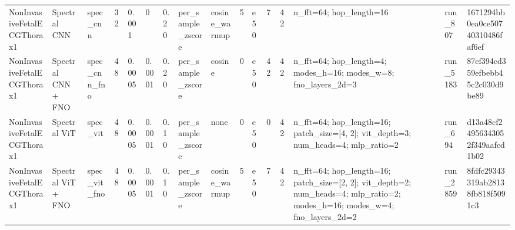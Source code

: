 \begin{table}
\begin{tabular}{llllllllllllllll}
NonInvasiveFetalECGThorax1 & Spectral CNN & spec\_cnn & 32 & 0.001 & 0 & 0.20 & per\_sample\_zscore & cosine\_warmup & 5 & e50 & 7 & 42 & n\_fft=64; hop\_length=16 & run\_807 & 1671294bb0ea0ce50740310486faf6ef \\
NonInvasiveFetalECGThorax1 & Spectral CNN + FNO & spec\_cnn\_fno & 48 & 0.0005 & 0.0001 & 0.20 & per\_sample\_zscore & cosine & 0 & e50 & 42 & 42 & n\_fft=64; hop\_length=4; modes\_h=16; modes\_w=8; fno\_layers\_2d=3 & run\_5183 & 87ef394cd359efbebb45c2c030d9be89 \\
NonInvasiveFetalECGThorax1 & Spectral ViT & spec\_vit & 48 & 0.0005 & 0.0001 & 0.10 & per\_sample\_zscore & none & 0 & e50 & 0 & 42 & n\_fft=64; hop\_length=16; patch\_size=[4, 2]; vit\_depth=3; num\_heads=4; mlp\_ratio=2 & run\_694 & d13a48cf24956343052f349aafcd1b02 \\
NonInvasiveFetalECGThorax1 & Spectral ViT + FNO & spec\_vit\_fno & 48 & 0.0005 & 0.0001 & 0.10 & per\_sample\_zscore & cosine\_warmup & 5 & e50 & 7 & 42 & n\_fft=64; hop\_length=16; patch\_size=[2, 2]; vit\_depth=2; num\_heads=4; mlp\_ratio=2; modes\_h=16; modes\_w=4; fno\_layers\_2d=2 & run\_2859 & 8fdfc29343319ab28138fb818f5091c3 \\
\bottomrule
\end{tabular}
\end{table}
